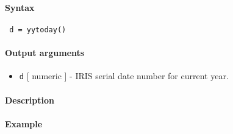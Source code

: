 


	\paragraph{Syntax}
 
 \begin{verbatim}
 d = yytoday()
 \end{verbatim}
 
 \paragraph{Output arguments}
 
 \begin{itemize}
 \item
   \texttt{d} {[} numeric {]} - IRIS serial date number for current year.
 \end{itemize}
 
 \paragraph{Description}
 
 \paragraph{Example}



